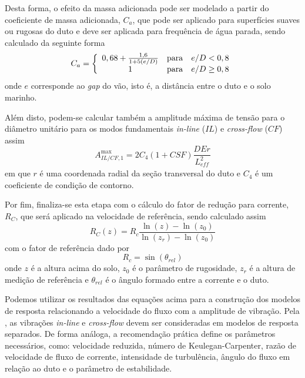 Desta forma, o efeito da massa adicionada pode ser modelado a partir do coeficiente de massa adicionada, $C_a$, que pode ser aplicado para superfícies suaves ou rugosas do duto e deve ser aplicada para frequência de água parada, sendo calculado da seguinte forma
\begin{equation}
\label{eq:jdsn-Ca}
C_a = \left\{
\begin{array}{c c l}
	0,68 + \frac{1,6}{1 + 5 (e/D)} & \mathrm{para} & e/D < 0,8 \\
	1                              & \mathrm{para} & e/D \geq 0,8 
\end{array}
\right.
\end{equation}
onde $e$ corresponde ao \textit{gap} do vão, isto é, a distância entre o duto e o solo marinho.

Além disto, podem-se calcular também a amplitude máxima de tensão para o diâmetro unitário para os modos fundamentais \textit{in-line} ($\mathit{IL}$) e \textit{cross-flow} ($\mathit{CF}$) assim
\begin{equation}
\label{eq:jdsn-Ailcf}
A_{\mathit{IL}/\mathit{CF}, 1}^\mathrm{max} = 2 C_4(1 + \mathit{CSF})\frac{D E r}{L_\mathit{eff}^2}
\end{equation}
em que $r$ é uma coordenada radial da seção transversal do duto e $C_4$ é um coeficiente de condição de contorno.


Por fim, finaliza-se esta etapa com o cálculo do fator de redução para corrente, $R_C$, que será aplicado na velocidade de referência, sendo calculado assim
\begin{equation}
\label{eq:jdsn-R_C}
R_C(z) = R_c \frac{\ln(z)-\ln(z_0)}{\ln(z_r)-\ln(z_0)}
\end{equation}
com o fator de referência dado por
\begin{equation}
\nonumber
R_c = \sin(\theta_\mathit{rel}) 
\end{equation}
onde $z$ é a altura acima do solo, $z_0$ é o parâmetro de rugosidade, $z_r$ é a altura de medição de referência e $\theta_\mathit{rel}$ é o ângulo formado entre a corrente e o duto.

Podemos utilizar os resultados das equações acima para a construção dos modelos de resposta relacionando a velocidade do fluxo com a amplitude de vibração. Pela , as vibrações \textit{in-line} e \textit{cross-flow} devem ser consideradas em modelos de resposta separados. De forma análoga, a recomendação prática define os parâmetros necessários, como: velocidade reduzida, número de Keulegan-Carpenter, razão de velocidade de fluxo de corrente, intensidade de turbulência, ângulo do fluxo em relação ao duto e o parâmetro de estabilidade.

